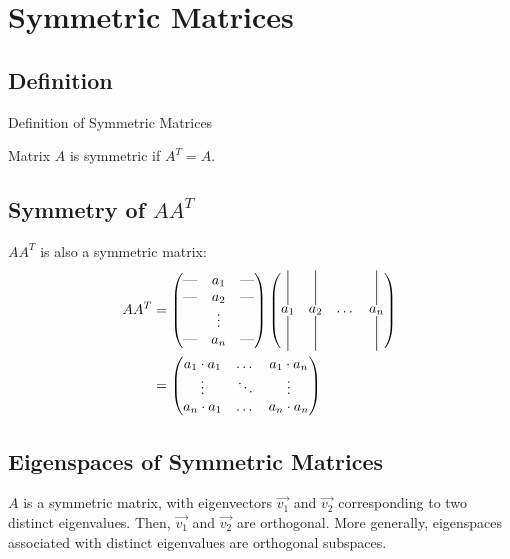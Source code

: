 \section{Symmetric Matrices}
\subsection{Definition}
\begin{definition} Definition of Symmetric Matrices

    Matrix \(A\) is symmetric if \(A^T = A\).
\end{definition}

\subsection{Symmetry of \(A A^T\)}
\(A A^T\) is also a symmetric matrix:
\begin{align}
    A A^T &= \begin{pmatrix}
        \text{---} & a_1 & \text{---} \\
        \text{---} & a_2 & \text{---} \\
        & \vdots & \\
        \text{---} & a_n & \text{---}
    \end{pmatrix}
    \begin{pmatrix}
        \spike{25pt}{$a_1$}  & \spike{25pt}{$a_2$} & \dots & \spike{25pt}{$a_n$}
    \end{pmatrix} \\
    &= \begin{pmatrix}
        a_1 \cdot a_1 & \dots  & a_1 \cdot a_n \\
        \vdots & \ddots & \vdots \\
        a_n \cdot a_1 & \dots  & a_n \cdot a_n
    \end{pmatrix}
\end{align}

\subsection{Eigenspaces of Symmetric Matrices}
\begin{theorem}
    \(A\) is a symmetric matrix, with eigenvectors \(\Vec{v_1}\) and \(\Vec{v_2}\) corresponding to two distinct eigenvalues. Then, \(\Vec{v_1}\) and \(\Vec{v_2}\) are orthogonal. More generally, eigenspaces associated with distinct eigenvalues are orthogonal subspaces.
\end{theorem}

